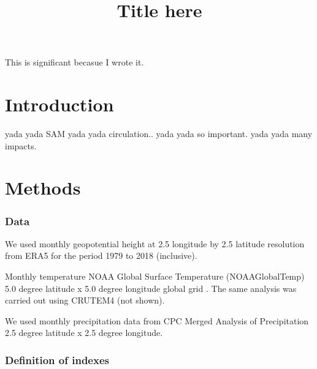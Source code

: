 \documentclass[]{ametsocV5}
\title{Title here}
\affiliation{CIMA UBA blablabla}
\begin{document}
\maketitle


%
%
\statement
This is significant becasue I wrote it.



%

\section{Introduction}

yada yada SAM yada yada circulation.. yada yada so important. yada yada
many impacts.

\section{Methods}

\subsubsection{Data}

We used monthly geopotential height at 2.5 longitude by 2.5 latitude
resolution from ERA5 \citep{hersbach} for the period 1979 to 2018
(inclusive).

Monthly temperature NOAA Global Surface Temperature (NOAAGlobalTemp) 5.0
degree latitude x 5.0 degree longitude global grid
\citep{vose2012, smith2008}. The same analysis was carried out using
CRUTEM4 \citep{osborn2014} (not shown).

We used monthly precipitation data from CPC Merged Analysis of
Precipitation \citep{xie1997} 2.5 degree latitude x 2.5 degree
longitude.

\subsubsection{Definition of indexes}
\end{document}
